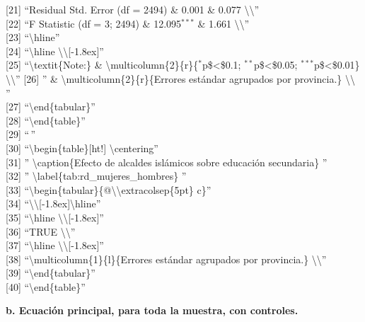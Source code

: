 \documentclass[
]{article}
\begin{document}
{[}21{]} ``Residual Std. Error (df = 2494) \& 0.001 \& 0.077
\textbackslash\textbackslash{}''\\
{[}22{]} ``F Statistic (df = 3; 2494) \& 12.095\(^{***}\) \& 1.661
\textbackslash\textbackslash{}''\\
{[}23{]} ``\textbackslash hline''\\
{[}24{]} ``\textbackslash hline
\textbackslash\textbackslash{[}-1.8ex{]}''\\
{[}25{]} ``\textbackslash textit\{Note:\} \&
\textbackslash multicolumn\{2\}\{r\}\{\(^{*}\)p\$\textless\$0.1;
\(^{**}\)p\$\textless\$0.05; \(^{***}\)p\$\textless\$0.01\}
\textbackslash\textbackslash{}'' {[}26{]} '' \&
\textbackslash multicolumn\{2\}\{r\}\{Errores estándar agrupados por
provincia.\} \textbackslash\textbackslash{} ''\\
{[}27{]} ``\textbackslash end\{tabular\}''\\
{[}28{]} ``\textbackslash end\{table\}''\\
{[}29{]} ``\,''\\
{[}30{]} ``\textbackslash begin\{table\}{[}ht!{]}
\textbackslash centering''\\
{[}31{]} '' \textbackslash caption\{Efecto de alcaldes islámicos sobre
educación secundaria\} ''\\
{[}32{]} '' \textbackslash label\{tab:rd\_mujeres\_hombres\} ''\\
{[}33{]}
``\textbackslash begin\{tabular\}\{@\textbackslash\textbackslash extracolsep\{5pt\}
c\}''\\
{[}34{]}
``\textbackslash\textbackslash{[}-1.8ex{]}\textbackslash hline''\\
{[}35{]} ``\textbackslash hline
\textbackslash\textbackslash{[}-1.8ex{]}''\\
{[}36{]} ``TRUE \textbackslash\textbackslash{}''\\
{[}37{]} ``\textbackslash hline
\textbackslash\textbackslash{[}-1.8ex{]}''\\
{[}38{]} ``\textbackslash multicolumn\{1\}\{l\}\{Errores estándar
agrupados por provincia.\} \textbackslash\textbackslash{}''\\
{[}39{]} ``\textbackslash end\{tabular\}''\\
{[}40{]} ``\textbackslash end\{table\}''

\newpage

\textbf{b. Ecuación principal, para toda la muestra, con controles.}
\end{document}
